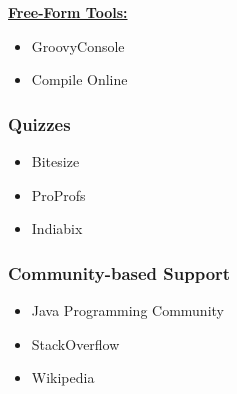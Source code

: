 \documentclass{article}
\begin{document}
\textbf{\underline{Free-Form Tools:}}\\

\begin{itemize}
\item GroovyConsole
\item Compile Online
\end{itemize}

\subsubsection{Quizzes}

\begin{itemize}
\item Bitesize
\item ProProfs
\item Indiabix
\end{itemize}

\subsubsection{Community-based Support}

\begin{itemize}
\item Java Programming Community
\item StackOverflow
\item Wikipedia
\end{itemize}
\end{document}
